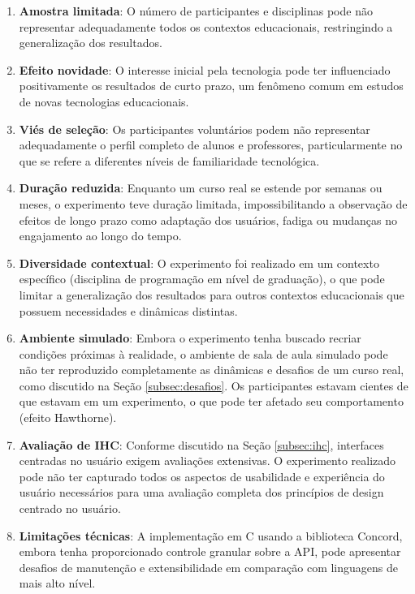 \begin{enumerate}
\item \textbf{Amostra limitada}: O número de participantes e disciplinas pode não representar adequadamente todos os contextos educacionais, restringindo a generalização dos resultados.
\item \textbf{Efeito novidade}: O interesse inicial pela tecnologia pode ter influenciado positivamente os resultados de curto prazo, um fenômeno comum em estudos de novas tecnologias educacionais.
\item \textbf{Viés de seleção}: Os participantes voluntários podem não representar adequadamente o perfil completo de alunos e professores, particularmente no que se refere a diferentes níveis de familiaridade tecnológica.
\item \textbf{Duração reduzida}: Enquanto um curso real se estende por semanas ou meses, o experimento teve duração limitada, impossibilitando a observação de efeitos de longo prazo como adaptação dos usuários, fadiga ou mudanças no engajamento ao longo do tempo.
\item \textbf{Diversidade contextual}: O experimento foi realizado em um contexto específico (disciplina de programação em nível de graduação), o que pode limitar a generalização dos resultados para outros contextos educacionais que possuem necessidades e dinâmicas distintas.
\item \textbf{Ambiente simulado}: Embora o experimento tenha buscado recriar condições próximas à realidade, o ambiente de sala de aula simulado pode não ter reproduzido completamente as dinâmicas e desafios de um curso real, como discutido na Seção \ref{subsec:desafios}. Os participantes estavam cientes de que estavam em um experimento, o que pode ter afetado seu comportamento (efeito Hawthorne).
\item \textbf{Avaliação de IHC}: Conforme discutido na Seção \ref{subsec:ihc}, interfaces centradas no usuário exigem avaliações extensivas. O experimento realizado pode não ter capturado todos os aspectos de usabilidade e experiência do usuário necessários para uma avaliação completa dos princípios de design centrado no usuário.
\item \textbf{Limitações técnicas}: A implementação em C usando a biblioteca Concord, embora tenha proporcionado controle granular sobre a API, pode apresentar desafios de manutenção e extensibilidade em comparação com linguagens de mais alto nível.
\end{enumerate}

